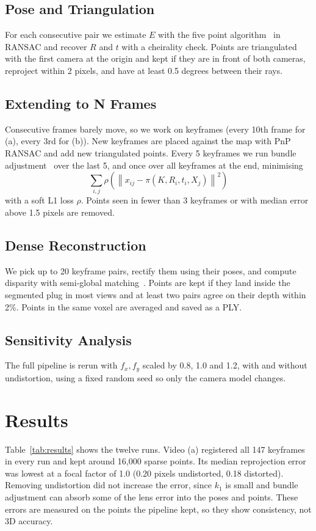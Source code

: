 \documentclass[conference]{assets/latex/IEEEtran}
\begin{document}
\subsection{Pose and Triangulation}
For each consecutive pair we estimate $E$ with the five point
algorithm~\cite{nister2004five} in RANSAC and recover $R$ and $t$ with a
cheirality check. Points are triangulated with the first camera at the
origin and kept if they are in front of both cameras, reproject within
2 pixels, and have at least 0.5 degrees between their rays.

\subsection{Extending to N Frames}
Consecutive frames barely move, so we work on keyframes (every 10th frame
for (a), every 3rd for (b)). New keyframes are placed against the map
with PnP RANSAC and add new triangulated points. Every 5 keyframes we run
bundle adjustment~\cite{triggs2000bundle} over the last 5, and once over
all keyframes at the end, minimising
\begin{equation}
\sum_{i,j} \rho\left(\left\lVert x_{ij} - \pi(K, R_i, t_i, X_j)\right\rVert^2\right)
\end{equation}
with a soft L1 loss $\rho$. Points seen in fewer than 3 keyframes or with
median error above 1.5 pixels are removed.

\subsection{Dense Reconstruction}
We pick up to 20 keyframe pairs, rectify them using their poses, and
compute disparity with semi-global matching~\cite{hirschmuller2008sgm}.
Points are kept if they land inside the segmented plug in most views and
at least two pairs agree on their depth within 2\%. Points in the same
voxel are averaged and saved as a PLY.

\subsection{Sensitivity Analysis}
The full pipeline is rerun with $f_x, f_y$ scaled by 0.8, 1.0 and 1.2,
with and without undistortion, using a fixed random seed so only the
camera model changes.

\section{Results}\label{sec:results}
Table~\ref{tab:results} shows the twelve runs. Video (a) registered all 147
keyframes in every run and kept around 16,000 sparse points. Its median
reprojection error was lowest at a focal factor of 1.0 (0.20 pixels
undistorted, 0.18 distorted). Removing undistortion did not
increase the error, since $k_1$ is small and bundle adjustment can absorb some
of the lens error into the poses and points. These errors are measured on the
points the pipeline kept, so they show consistency, not 3D accuracy.
\end{document}
